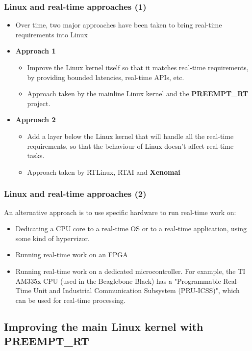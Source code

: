 \begin{frame}
  \frametitle{Linux and real-time approaches (1)}
  \begin{itemize}
  \item Over time, two major approaches have been taken to bring
    real-time requirements into Linux
  \item {\bf Approach 1}
    \begin{itemize}
    \item Improve the Linux kernel itself so that it matches real-time
      requirements, by providing bounded latencies, real-time APIs,
      etc.
    \item Approach taken by the mainline Linux kernel and the
      {\bf PREEMPT\_RT} project.
    \end{itemize}
  \item {\bf Approach 2}
    \begin{itemize}
    \item Add a layer below the Linux kernel that will handle all the
      real-time requirements, so that the behaviour of Linux doesn't
      affect real-time tasks.
    \item Approach taken by RTLinux, RTAI and {\bf Xenomai}
    \end{itemize}
  \end{itemize}
\end{frame}

\begin{frame}
  \frametitle{Linux and real-time approaches (2)}
  An alternative approach is to use specific hardware to run real-time
  work on:
  \begin{itemize}
  \item Dedicating a CPU core to a real-time OS or to a real-time
        application, using some kind of hypervizor.
  \item Running real-time work on an FPGA
  \item Running real-time work on a dedicated microcontroller.
        For example, the TI AM335x CPU (used in the Beaglebone Black)
        has a "Programmable Real-Time Unit and Industrial
        Communication Subsystem (PRU-ICSS)", which can be used for
        real-time processing.
  \end{itemize}
\end{frame}

\subsection[PREEMPT\_RT Patches]{Improving the main Linux kernel with
  PREEMPT\_RT}

